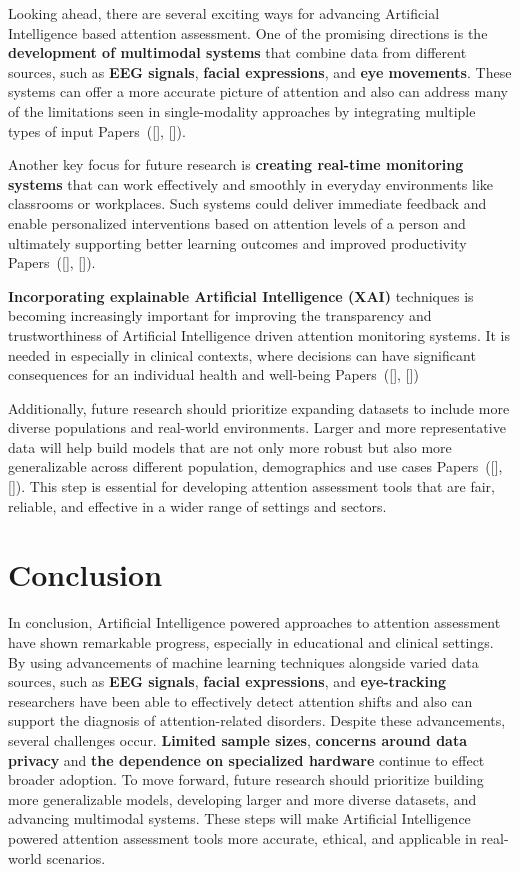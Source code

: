 \documentclass[12pt]{article}
\begin{document}
Looking ahead, there are several exciting ways for advancing Artificial Intelligence based attention assessment. One of the promising directions is the \textbf{development of multimodal systems} that combine data from different sources, such as \textbf{EEG signals}, \textbf{facial expressions}, and \textbf{eye movements}. These systems can offer a more accurate picture of attention and also can address many of the limitations seen in single-modality approaches by integrating multiple types of input Papers~([\citealp{ref1}], [\citealp{ref7}]).

Another key focus for future research is \textbf{creating real-time monitoring systems} that can work effectively and smoothly in everyday environments like classrooms or workplaces. Such systems could deliver immediate feedback and enable personalized interventions based on attention levels of a person and ultimately supporting better learning outcomes and improved productivity Papers~([\citealp{ref6}], [\citealp{ref8}]).

\textbf{Incorporating explainable Artificial Intelligence (XAI)} techniques is becoming increasingly important for improving the transparency and trustworthiness of Artificial Intelligence driven attention monitoring systems. It is needed in especially in clinical contexts, where decisions can have significant consequences for an individual health and well-being Papers~([\citealp{ref10}], [\citealp{ref19}])

Additionally, future research should prioritize expanding datasets to include more diverse populations and real-world environments. Larger and more representative data will help build models that are not only more robust but also more generalizable across different population, demographics and use cases Papers~([\citealp{ref9}], [\citealp{ref16}]). This step is essential for developing attention assessment tools that are fair, reliable, and effective in a wider range of settings and sectors.

\section{Conclusion}
In conclusion, Artificial Intelligence powered approaches to attention assessment have shown remarkable progress, especially in educational and clinical settings. By using advancements of machine learning techniques alongside varied data sources, such as \textbf{EEG signals}, \textbf{facial expressions}, and \textbf{eye-tracking} researchers have been able to effectively detect attention shifts and also can support the diagnosis of attention-related disorders.
Despite these advancements, several challenges occur. \textbf{Limited sample sizes}, \textbf{concerns around data privacy} and \textbf{the dependence on specialized hardware} continue to effect broader adoption. To move forward, future research should prioritize building more generalizable models, developing larger and more diverse datasets, and advancing multimodal systems. These steps will make Artificial Intelligence powered attention assessment tools more accurate, ethical, and applicable in real-world scenarios. \\ 
\end{document}
